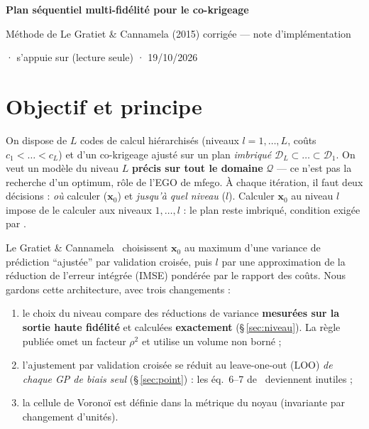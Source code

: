 \documentclass[10pt,a4paper]{article}
\theoremstyle{plain}
\newcommand{\vx}{\bm{x}}
\newcommand{\Q}{\mathcal{Q}}
\newcommand{\D}{\mathcal{D}}
\begin{document}
{\centering
{\Large\bfseries\color{blue!40!black} Plan séquentiel multi-fidélité pour le co-krigeage\par}
\vspace{0.2em}
{\large Méthode de Le Gratiet \& Cannamela (2015) corrigée — note d'implémentation\par}
\vspace{0.3em}
{\small {} · s'appuie sur  (lecture seule)
· 19/10/2026\par}
\vspace{0.2em}}

\section{Objectif et principe}
On dispose de $L$ codes de calcul hiérarchisés (niveaux $l=1,\dots,L$, coûts $c_1<\dots<c_L$) et d'un
co-krigeage  ajusté sur un plan \emph{imbriqué} $\D_L\subset\dots\subset\D_1$. On veut un
modèle du niveau $L$ \textbf{précis sur tout le domaine} $\Q$ — ce n'est pas la recherche d'un optimum, rôle
de l'EGO de mfego. À chaque itération, il faut deux décisions : \emph{où} calculer ($\vx_0$) et \emph{jusqu'à
quel niveau} ($l$). Calculer $\vx_0$ au niveau $l$ impose de le calculer aux niveaux $1,\dots,l$ : le plan
reste imbriqué, condition exigée par .

Le Gratiet \& Cannamela~\cite{LGC15} choisissent $\vx_0$ au maximum d'une variance de prédiction
\enquote{ajustée} par validation croisée, puis $l$ par une approximation de la réduction de l'erreur intégrée
(IMSE) pondérée par le rapport des coûts. Nous gardons cette architecture, avec trois changements :
\begin{enumerate}
  \item le choix du niveau compare des réductions de variance \textbf{mesurées sur la sortie haute fidélité}
        et calculées \textbf{exactement} (§\,\ref{sec:niveau}). La règle publiée omet un facteur $\rho^2$ et
        utilise un volume non borné ;
  \item l'ajustement par validation croisée se réduit au leave-one-out (LOO) \emph{de chaque GP de biais
        seul} (§\,\ref{sec:point}) : les éq.~6–7 de~\cite{LGC15} deviennent inutiles ;
  \item la cellule de Voronoï est définie dans la métrique du noyau (invariante par changement d'unités).
\end{enumerate}
\end{document}

